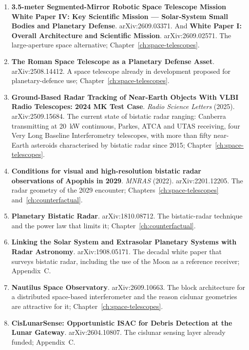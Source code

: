 \begin{enumerate}[leftmargin=2.9em,itemsep=4pt,resume]
\item \textbf{3.5-meter Segmented-Mirror Robotic Space Telescope Mission White
Paper IV: Key Scientific Mission --- Solar-System Small Bodies and Planetary
Defense}. arXiv:2609.03371. And \textbf{White Paper I: Overall Architecture
and Scientific Mission}. arXiv:2609.02571. The large-aperture space
alternative; Chapter~\ref{ch:space-telescopes}.

\item \textbf{The Roman Space Telescope as a Planetary Defense Asset}.
arXiv:2508.14412. A space telescope already in development proposed for
planetary-defence use; Chapter~\ref{ch:space-telescopes}.

\item \textbf{Ground-Based Radar Tracking of Near-Earth Objects With VLBI Radio
Telescopes: 2024 MK Test Case}. \emph{Radio Science Letters} (2025).
arXiv:2509.15684. The current state of bistatic radar ranging: Canberra
transmitting at 20~kW continuous, Parkes, ATCA and UTAS receiving, four
Very Long Baseline Interferometry telescopes, with more than fifty
near-Earth asteroids characterised by bistatic radar since 2015;
Chapter~\ref{ch:space-telescopes}.

\item \textbf{Conditions for visual and high-resolution bistatic radar
observations of Apophis in 2029}. \emph{MNRAS} (2022). arXiv:2201.12205.
The radar geometry of the 2029 encounter; Chapters~\ref{ch:space-telescopes}
and~\ref{ch:counterfactual}.

\item \textbf{Planetary Bistatic Radar}. arXiv:1810.08712. The bistatic-radar
technique and the power law that limits it; Chapter~\ref{ch:counterfactual}.

\item \textbf{Linking the Solar System and Extrasolar Planetary Systems with
Radar Astronomy}. arXiv:1908.05171. The decadal white paper that surveys
bistatic radar, including the use of the Moon as a reference receiver;
Appendix~C.

\item \textbf{Nautilus Space Observatory}. arXiv:2609.10663. The block
architecture for a distributed space-based interferometer and the reason
cislunar geometries are attractive for it; Chapter~\ref{ch:space-telescopes}.

\item \textbf{CisLunarSense: Opportunistic ISAC for Debris Detection at the
Lunar Gateway}. arXiv:2604.10807. The cislunar sensing layer already
funded; Appendix~C.

\end{enumerate}

